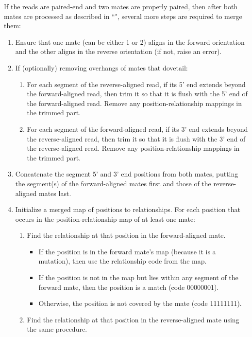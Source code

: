 \documentclass[11pt]{article}
\begin{document}
If the reads are paired-end and two mates are properly paired, then after both mates are processed as described in ``", several more steps are required to merge them:
\begin{enumerate}
    \item Ensure that one mate (can be either 1 or 2) aligns in the forward orientation and the other aligns in the reverse orientation (if not, raise an error).
    \item If (optionally) removing overhangs of mates that dovetail:
    \begin{enumerate}
        \item For each segment of the reverse-aligned read, if its 5' end extends beyond the forward-aligned read, then trim it so that it is flush with the 5' end of the forward-aligned read. Remove any position-relationship mappings in the trimmed part.
        \item For each segment of the forward-aligned read, if its 3' end extends beyond the reverse-aligned read, then trim it so that it is flush with the 3' end of the reverse-aligned read. Remove any position-relationship mappings in the trimmed part.
    \end{enumerate}
    \item Concatenate the segment 5' and 3' end positions from both mates, putting the segment(s) of the forward-aligned mates first and those of the reverse-aligned mates last.
    \item Initialize a merged map of positions to relationships. For each position that occurs in the position-relationship map of at least one mate:
    \begin{enumerate}
        \item Find the relationship at that position in the forward-aligned mate.
        \begin{itemize}
            \item If the position is in the forward mate's map (because it is a mutation), then use the relationship code from the map.
            \item If the position is not in the map but lies within any segment of the forward mate, then the position is a match (code 00000001).
            \item Otherwise, the position is not covered by the mate (code 11111111).
        \end{itemize}
        \item Find the relationship at that position in the reverse-aligned mate using the same procedure.

\end{enumerate}
\end{enumerate}
\end{document}
